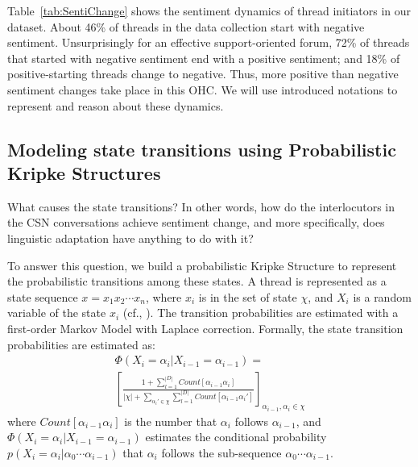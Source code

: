 Table~\ref{tab:SentiChange} shows the sentiment dynamics of thread initiators in our dataset. About 46\% of threads in the data collection start with negative sentiment. Unsurprisingly for an effective support-oriented forum, 72\% of threads that started with negative sentiment end with a positive sentiment; and 18\% of positive-starting threads change to negative. Thus,  more positive than negative sentiment changes take place in this OHC. We will use introduced notations to represent and reason about these dynamics.

\subsection{Modeling state transitions using Probabilistic Kripke Structures \label{sec:ProbKS}}

What causes the state transitions?  In other words, how do the interlocutors in the CSN conversations achieve sentiment change, and more specifically, does linguistic adaptation have anything to do with it?

To answer this question, we build a probabilistic Kripke Structure to represent the probabilistic transitions among these states.  A thread is represented as a state sequence $x=x_{1}x_{2} \cdots x_{n}$, where $x_{i}$ is in the set of state $\chi$, and $X_{i}$ is a random variable of the state $x_{i}$ (cf.,  \cite{bui2015temporal}). The transition probabilities are estimated with a first-order Markov Model with Laplace correction. Formally, the state transition probabilities are estimated as:
\begin{equation}
\begin{split}
\Phi (X_{i}=\alpha_{i}|X_{i-1}=\alpha_{i-1}) =  \\
\left [ \frac{1+\sum _{l=1}^{|D|} Count \left [ \alpha_{i-1} \alpha_{i} \right ] }{ \left | \chi \right | +\sum_{{\alpha_{i}}' \in \chi } \sum_{l=1}^{|D|} Count \left [ \alpha_{i-1}{\alpha_{i}}' \right ] } \right ]_{\alpha_{i-1},\alpha_{i} \in \chi}
\end{split}
\end{equation}
where $Count \left[ \alpha_{i-1}\alpha_{i} \right]$ is the number that $\alpha_{i}$ follows $\alpha_{i-1}$, and $\Phi (X_{i}=\alpha_{i}|X_{i-1}=\alpha_{i-1})$ estimates the conditional probability $p(X_{i}=\alpha_{i}|\alpha_{0} \cdots \alpha_{i-1})$ that $\alpha_{i}$ follows the sub-sequence $\alpha_{0} \cdots \alpha_{i-1}$.

